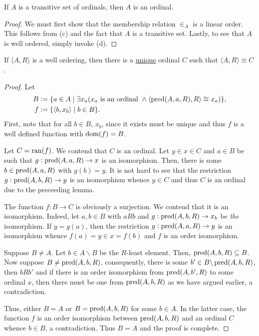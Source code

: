\begin{lemma}
    If $A$ is a transitive set of ordinals, then $A$ is an ordinal.
\end{lemma}
\begin{proof}
    We must first show that the membership relation $\in_A$ is a linear order. This follows from  (c) and the fact that $A$ is a transitive set. Lastly, to see that $A$ is well ordered, simply invoke  (d).
\end{proof}

\begin{theorem}
    If $\langle A, R\rangle$ is a well ordering, then there is a \underline{unique} ordinal $C$ such that $\langle A, R\rangle\cong C$.
\end{theorem}
\begin{proof}
    Let 
    \begin{align*}
        B &:= \{a\in A\mid\exists x_a(x_a\text{ is an ordinal }\wedge\langle\operatorname{pred}(A,a,R), R\rangle\cong x_a)\},\\
        f &:= \{\langle b, x_b\rangle\mid b\in B\}.
    \end{align*}
    First, note that for all $b\in B$, $x_b$, since it exists must be unique and thus $f$ is a well defined function with $\operatorname{dom}(f) = B$.

    Let $C = \operatorname{ran}(f)$. We contend that $C$ is an ordinal. Let $y\in x\in C$ and $a\in B$ be such that $g:\operatorname{pred}(A,a,R)\to x$ is an isomorphism. Then, there is some $b\in\operatorname{pred}(A,a,R)$ with $g(b) = y$. It is not hard to see that the restriction $g:\operatorname{pred}(A,b,R)\to y$ is an isomorphism whence $y\in C$ and thus $C$ is an ordinal due to the preceeding lemma.

    The function $f: B\to C$ is obviously a surjection. We contend that it is an isomorphism. Indeed, let $a,b\in B$ with $a R b$ and $g: \operatorname{pred}(A,b,R)\to x_b$ be \emph{the} isomorphism. If $y = g(a)$, then the restriction $g:\operatorname{pred}(A,a,R)\to y$ is an isomorphism whence $f(a) = y\in x = f(b)$ and $f$ is an order isomorphism.

    Suppose $B\ne A$. Let $b\in A\backslash B$ be the $R$-least element. Then, $\operatorname{pred}(A,b,R)\subseteq B$. Now suppose $B\ne\operatorname{pred}(A,b,R)$, consequently, there is some $b'\in B\backslash\operatorname{pred}(A,b,R)$, then $bRb'$ and if there is an order isomorphism from $\operatorname{pred}(A,b',R)$ to some ordinal $x$, then there must be one from $\operatorname{pred}(A,b,R)$ as we have argued earlier, a contradiction. 
    
    Thus, either $B = A$ or $B = \operatorname{pred}(A,b,R)$ for some $b\in A$. In the latter case, the function $f$ is an order isomorphism between $\operatorname{pred}(A,b,R)$ and an ordinal $C$ whence $b\in B$, a contradiction. Thus $B = A$ and the proof is complete.
\end{proof}

